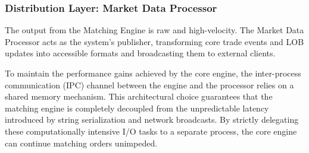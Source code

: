 \documentclass[12pt,a4paper]{article}
\begin{document}
\subsubsection{Distribution Layer: Market Data Processor}
The output from the Matching Engine is raw and high-velocity. The Market Data Processor acts as the system's publisher, transforming core trade events and LOB updates into accessible formats and broadcasting them to external clients.

To maintain the performance gains achieved by the core engine, the inter-process communication (IPC) channel between the engine and the processor relies on a shared memory mechanism. This architectural choice guarantees that the matching engine is completely decoupled from the unpredictable latency introduced by string serialization and network broadcasts. By strictly delegating these computationally intensive I/O tasks to a separate process, the core engine can continue matching orders unimpeded.
\end{document}
